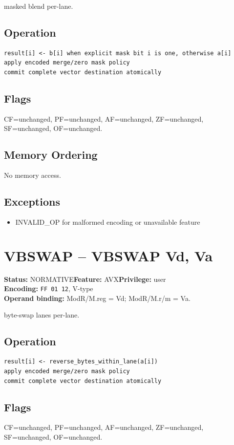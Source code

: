 \documentclass[10pt]{article}
\begin{document}
masked blend per-lane.

\subsection*{Operation}
\begin{lstlisting}
result[i] <- b[i] when explicit mask bit i is one, otherwise a[i]
apply encoded merge/zero mask policy
commit complete vector destination atomically
\end{lstlisting}
\subsection*{Flags}
CF=unchanged, PF=unchanged, AF=unchanged, ZF=unchanged, SF=unchanged, OF=unchanged.
\subsection*{Memory Ordering}
No memory access.
\subsection*{Exceptions}
\begin{itemize}
\item INVALID\_OP for malformed encoding or unavailable feature
\end{itemize}
\clearpage

\section{VBSWAP -- VBSWAP Vd, Va}
\textbf{Status:} NORMATIVE\quad \textbf{Feature:} AVX\quad \textbf{Privilege:} user\\
\textbf{Encoding:} \texttt{FF 01 12}, V-type\\
\textbf{Operand binding:} ModR/M.reg = Vd; ModR/M.r/m = Va.

byte-swap lanes per-lane.

\subsection*{Operation}
\begin{lstlisting}
result[i] <- reverse_bytes_within_lane(a[i])
apply encoded merge/zero mask policy
commit complete vector destination atomically
\end{lstlisting}
\subsection*{Flags}
CF=unchanged, PF=unchanged, AF=unchanged, ZF=unchanged, SF=unchanged, OF=unchanged.
\end{document}
